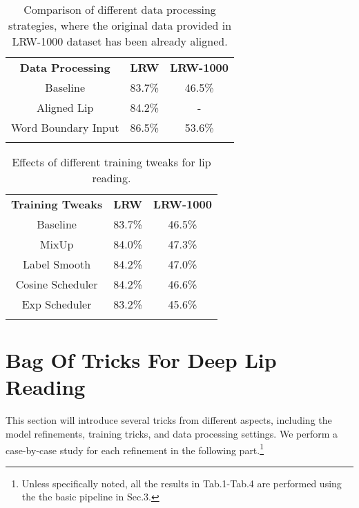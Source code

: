 \documentclass{article}
\begin{document}
\begin{table}[t]
  \centering
    \begin{tabular}{!{\vrule width1.2pt}c!{\vrule width1.2pt}c|c!{\vrule width1.2pt}}
    \Xhline{1.2pt}
    \textbf{Data Processing} & \textbf{LRW} & \textbf{LRW-1000} \bigstrut\\
    \Xhline{1.2pt}
    Baseline & 83.7\%  & 46.5\% \bigstrut\\
    \hline
    Aligned Lip & 84.2\% & - \bigstrut\\
    \hline
    Word Boundary Input & 86.5\% & 53.6\% \bigstrut\\
    \Xhline{1.2pt}
    \end{tabular}\caption{Comparison of different data processing strategies, where the original data provided in LRW-1000
dataset has been already aligned.}
  \label{table:dataprocess}\end{table}\begin{table}[t]
  \centering
    \begin{tabular}{!{\vrule width1.2pt}c!{\vrule width1.2pt}c|c!{\vrule width1.2pt}}
    \Xhline{1.2pt}
    \textbf{Training Tweaks} & \textbf{LRW} & \textbf{LRW-1000} \bigstrut\\
    \Xhline{1.2pt}
    Baseline  & 83.7\%  & 46.5\% \bigstrut\\
    \hline
    MixUp & 84.0\%  & 47.3\% \bigstrut\\
    \hline
    Label Smooth & 84.2\%  & 47.0\% \bigstrut\\
    \hline
    Cosine Scheduler & 84.2\%  & 46.6\% \bigstrut\\
    \hline
    Exp Scheduler & 83.2\%  & 45.6\% \bigstrut\\
    \Xhline{1.2pt}
    \end{tabular}\caption{Effects of different training tweaks for lip reading.}
  \label{table:training}\end{table}\vspace{-0.5em}
\section{Bag Of Tricks For Deep Lip Reading}
\vspace{-0.5em}
\label{sec:bagoftricks}
This section will introduce several tricks from different aspects, including the model refinements, training tricks,  and data processing settings. We perform a case-by-case study for each refinement in the following part.\footnote{Unless specifically noted, all the results in Tab.1-Tab.4 are performed using the the basic pipeline in Sec.3.}
\vspace{-0.5em}
\end{document}
